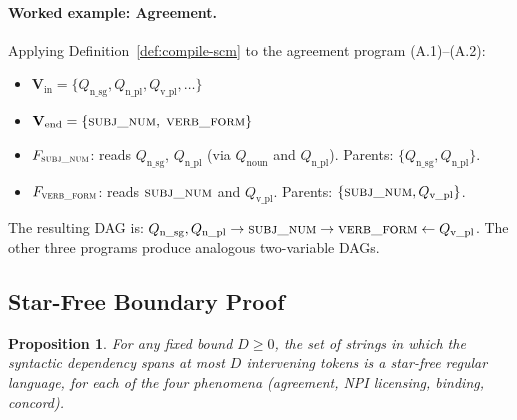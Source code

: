 \documentclass[11pt]{article}
\newtheorem{proposition}{Proposition}
\begin{document}
\paragraph{Worked example: Agreement.}
Applying Definition~\ref{def:compile-scm} to the agreement program (A.1)--(A.2):
\begin{itemize}[itemsep=2pt,leftmargin=*]
    \item $\mathbf{V}_\mathrm{in} = \{Q_\text{n\_sg}, Q_\text{n\_pl}, Q_\text{v\_pl}, \ldots\}$
    \item $\mathbf{V}_\mathrm{end} = \{\textsc{subj\_num},\; \textsc{verb\_form}\}$
    \item $F_{\textsc{subj\_num}}$: reads $Q_\text{n\_sg}$, $Q_\text{n\_pl}$ (via $Q_\text{noun}$ and $Q_\text{n\_pl}$). Parents: $\{Q_\text{n\_sg}, Q_\text{n\_pl}\}$.
    \item $F_{\textsc{verb\_form}}$: reads $\textsc{subj\_num}$ and $Q_\text{v\_pl}$. Parents: $\{\textsc{subj\_num}, Q_\text{v\_pl}\}$.
\end{itemize}
The resulting DAG is: $Q_\text{n\_sg}, Q_\text{n\_pl} \to \textsc{subj\_num} \to \textsc{verb\_form} \leftarrow Q_\text{v\_pl}$.
The other three programs produce analogous two-variable DAGs.

\subsection{Star-Free Boundary Proof}
\label{app:star-free-proof}

\begin{proposition}
\label{prop:star-free}
For any fixed bound $D \geq 0$, the set of strings in which the syntactic dependency spans at most $D$ intervening tokens is a star-free regular language, for each of the four phenomena (agreement, NPI licensing, binding, concord).
\end{proposition}
\end{document}
